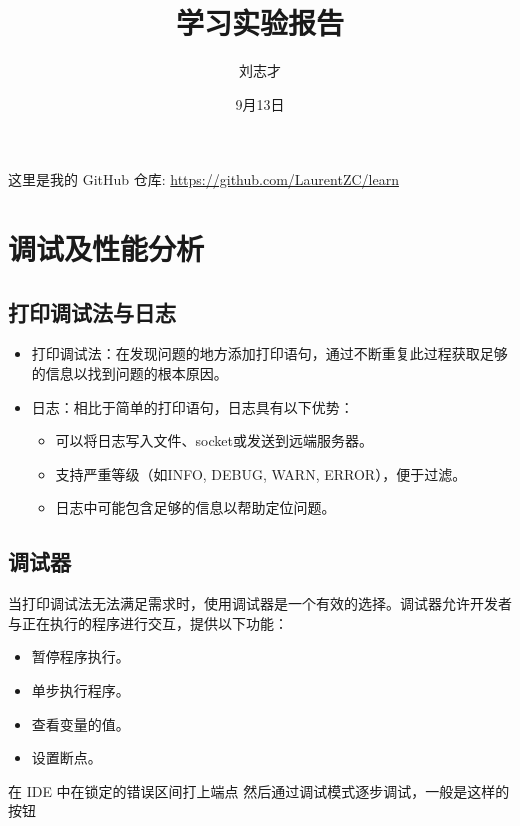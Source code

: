 \documentclass[16pt]{lzc}
\title{学习实验报告}
\author{刘志才}
\date{9月13日}
\begin{document}
    \maketitlepage
    \tableofcontents
    \newpage
    \setcounter{page}{1}

    这里是我的 GitHub 仓库: \href{https://github.com/LaurentZC/learn}{https://github.com/LaurentZC/learn}
    
    \section{调试及性能分析}\label{sec:1}

        \subsection{打印调试法与日志}\label{subsec:2}
            \begin{itemize}
                \item 打印调试法：在发现问题的地方添加打印语句，通过不断重复此过程获取足够的信息以找到问题的根本原因。
                \item 日志：相比于简单的打印语句，日志具有以下优势：
                \begin{itemize}
                    \item 可以将日志写入文件、socket或发送到远端服务器。
                    \item 支持严重等级（如INFO, DEBUG, WARN, ERROR），便于过滤。
                    \item 日志中可能包含足够的信息以帮助定位问题。
                \end{itemize}

            \end{itemize}

        \subsection{调试器}\label{subsec:5}
            当打印调试法无法满足需求时，使用调试器是一个有效的选择。调试器允许开发者与正在执行的程序进行交互，提供以下功能：

            \begin{itemize}
                \item 暂停程序执行。
                \item 单步执行程序。
                \item 查看变量的值。
                \item 设置断点。
            \end{itemize}

            在 IDE 中在锁定的错误区间打上端点
            然后通过调试模式逐步调试，一般是这样的按钮
            \newpage
\end{document}
